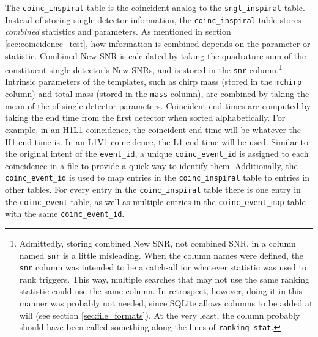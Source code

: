The \texttt{coinc\_inspiral} table is the coincident analog to the
\texttt{sngl\_inspiral} table. Instead of storing single-detector information,
the \texttt{coinc\_inspiral} table stores \emph{combined} statistics and
parameters. As mentioned in section \ref{sec:coincidence_test}, how information
is combined depends on the parameter or statistic. Combined New \ac{SNR} is
calculated by taking the quadrature sum of the constituent single-detector's
New \acp{SNR}, and is stored in the \texttt{snr} column.\footnote{Admittedly,
storing combined New \ac{SNR}, not combined \ac{SNR}, in a column named
\texttt{snr} is a little misleading. When the column names were defined, the
\texttt{snr} column was intended to be a catch-all for whatever statistic was
used to rank triggers. This way, multiple searches that may not use the same
ranking statistic could use the same column. In retrospect, however, doing it
in this manner was probably not needed, since SQLite allows columns to be added
at will (see section \ref{sec:file_formats}). At the very least, the column
probably should have been called something along the lines of
\texttt{ranking\_stat}.} Intrinsic parameters of the templates, such as chirp
mass (stored in the \texttt{mchirp} column) and total mass (stored in the
\texttt{mass} column), are combined by taking the mean of the of
single-detector parameters. Coincident end times are computed by taking the end
time from the first detector when sorted alphabetically. For example, in an
H1L1 coincidence, the coincident end time will be whatever the H1 end time is.
In an L1V1 coincidence, the L1 end time will be used. Similar to the original
intent of the \texttt{event\_id}, a unique \texttt{coinc\_event\_id} is
assigned to each coincidence in a file to provide a quick way to identify them.
Additionally, the \texttt{coinc\_event\_id} is used to map entries in the
\texttt{coinc\_inspiral} table to entries in other tables. For every entry in
the \texttt{coinc\_inspiral} table there is one entry in the
\texttt{coinc\_event} table, as well as multiple entries in the
\texttt{coinc\_event\_map} table with the same \texttt{coinc\_event\_id}.

